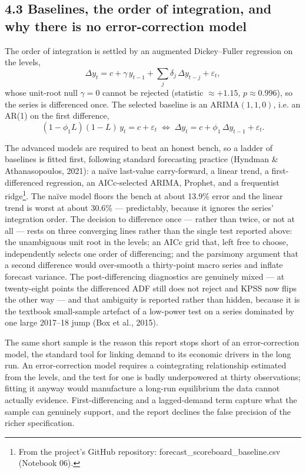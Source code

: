 \documentclass[10pt,twocolumn]{article}
\begin{document}
\subsection*{4.3 Baselines, the order of integration, and why there is no error-correction model}

\noindent The order of integration is settled by an augmented Dickey--Fuller
regression on the levels,
\begin{equation}
\Delta y_t=c+\gamma\,y_{t-1}+\textstyle\sum_{j}\delta_j\,\Delta y_{t-j}+\varepsilon_t,
\label{eq:adf}
\end{equation}
whose unit-root null $\gamma=0$ cannot be rejected (statistic $\approx+1.15$,
$p\approx0.996$), so the series is differenced once. The selected baseline is an
$\mathrm{ARIMA}(1,1,0)$, i.e. an AR(1) on the first difference,
\begin{equation}
(1-\phi_1 L)(1-L)\,y_t=c+\varepsilon_t
\;\Longleftrightarrow\;
\Delta y_t=c+\phi_1\,\Delta y_{t-1}+\varepsilon_t .
\label{eq:arima}
\end{equation}

The advanced models are required to beat an honest bench, so a ladder of baselines is fitted first, following standard forecasting practice (Hyndman \& Athanasopoulos, 2021): a naïve last-value carry-forward, a linear trend, a first-differenced regression, an AICc-selected ARIMA, Prophet, and a frequentist ridge\footnote{From the project's GitHub repository: forecast\_scoreboard\_baseline.csv (Notebook 06).}. The naïve model floors the bench at about 13.9\% error and the linear trend is worst at about 30.6\% --- predictably, because it ignores the series' integration order. The decision to difference once --- rather than twice, or not at all --- rests on three converging lines rather than the single test reported above: the unambiguous unit root in the levels; an AICc grid that, left free to choose, independently selects one order of differencing; and the parsimony argument that a second difference would over-smooth a thirty-point macro series and inflate forecast variance. The post-differencing diagnostics are genuinely mixed --- at twenty-eight points the differenced ADF still does not reject and KPSS now flips the other way --- and that ambiguity is reported rather than hidden, because it is the textbook small-sample artefact of a low-power test on a series dominated by one large 2017--18 jump (Box et al., 2015).

The same short sample is the reason this report stops short of an error-correction model, the standard tool for linking demand to its economic drivers in the long run. An error-correction model requires a cointegrating relationship estimated from the levels, and the test for one is badly underpowered at thirty observations; fitting it anyway would manufacture a long-run equilibrium the data cannot actually evidence. First-differencing and a lagged-demand term capture what the sample can genuinely support, and the report declines the false precision of the richer specification.
\end{document}
